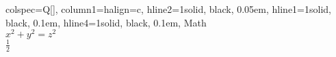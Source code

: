 \begin{table}
\centering
\begin{tblr}[         %
]                     %
{                     %
colspec={Q[]},
column{1}={}{halign=c},
hline{2}={1}{solid, black, 0.05em},
hline{1}={1}{solid, black, 0.1em},
hline{4}={1}{solid, black, 0.1em},
}                     %
Math \\
$x^2 + y^2 = z^2$ \\
$\frac{1}{2}$ \\
\end{tblr}
\end{table} 
